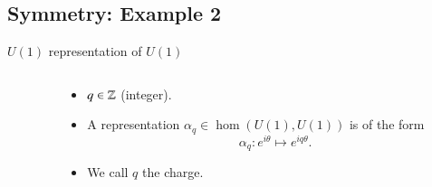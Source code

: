 \documentclass{beamer}
\begin{document}
\subsection{Symmetry: Example 2}

\begin{frame}{$U(1)$ representation of $U(1)$}
	\begin{columns}
		\begin{column}{0.6\textwidth}
			\begin{center}
				
			\end{center}
		\end{column}
		\begin{column}{0.4\textwidth}
			\begin{itemize}
				\item $q\in\mathbb{Z}$ (integer).
				\item A representation $\alpha_q\in\hom(U(1),U(1))$ is of the form
				\begin{equation*}
					\alpha_q:e^{i\theta}\mapsto e^{iq\theta}.
				\end{equation*}
				\item We call $q$ the charge.
			\end{itemize}
		\end{column}
	\end{columns}
\end{frame}
\end{document}
